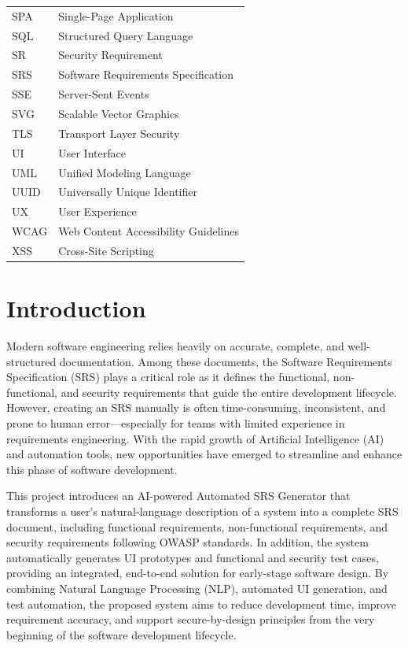 \documentclass[12pt,a4paper,oneside]{report}
\begin{document}
\begin{longtable}{L{3cm} L{10cm}}
SPA & Single-Page Application \\
SQL & Structured Query Language \\
SR & Security Requirement \\
SRS & Software Requirements Specification \\
SSE & Server-Sent Events \\
SVG & Scalable Vector Graphics \\
TLS & Transport Layer Security \\
UI & User Interface \\
UML & Unified Modeling Language \\
UUID & Universally Unique Identifier \\
UX & User Experience \\
WCAG & Web Content Accessibility Guidelines \\
XSS & Cross-Site Scripting \\
\bottomrule
\end{longtable}

\clearpage
{}

\chapter{Introduction}
Modern software engineering relies heavily on accurate, complete, and well-structured documentation. Among these documents, the Software Requirements Specification (SRS) plays a critical role as it defines the functional, non-functional, and security requirements that guide the entire development lifecycle. However, creating an SRS manually is often time-consuming, inconsistent, and prone to human error---especially for teams with limited experience in requirements engineering. With the rapid growth of Artificial Intelligence (AI) and automation tools, new opportunities have emerged to streamline and enhance this phase of software development.

This project introduces an AI-powered Automated SRS Generator that transforms a user's natural-language description of a system into a complete SRS document, including functional requirements, non-functional requirements, and security requirements following OWASP standards. In addition, the system automatically generates UI prototypes and functional and security test cases, providing an integrated, end-to-end solution for early-stage software design. By combining Natural Language Processing (NLP), automated UI generation, and test automation, the proposed system aims to reduce development time, improve requirement accuracy, and support secure-by-design principles from the very beginning of the software development lifecycle.
\end{document}
